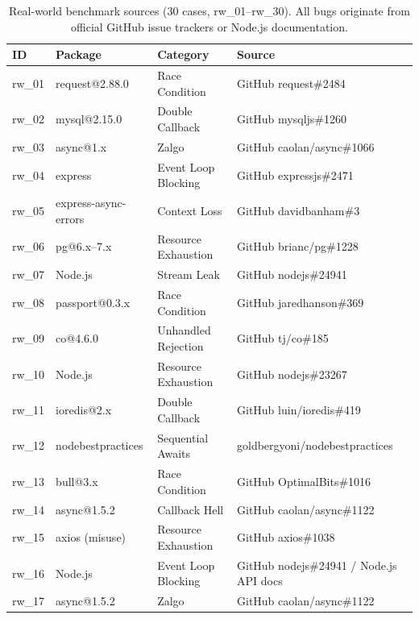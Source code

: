 \documentclass[runningheads]{llncs}
\begin{document}
\begin{table}[H]
  \centering
  \small
  \caption{Real-world benchmark sources (30 cases, rw\_01--rw\_30).
           All bugs originate from official GitHub issue trackers or
           Node.js documentation.}
  \label{tab:benchmark_sources}
  \begin{tabular}{@{}lllp{3.8cm}@{}}
    \toprule
    \textbf{ID} & \textbf{Package} & \textbf{Category} & \textbf{Source} \\
    \midrule
    rw\_01 & request@2.88.0        & Race Condition      & GitHub request\#2484 \\
    rw\_02 & mysql@2.15.0          & Double Callback     & GitHub mysqljs\#1260 \\
    rw\_03 & async@1.x             & Zalgo               & GitHub caolan/async\#1066 \\
    rw\_04 & express                & Event Loop Blocking & GitHub expressjs\#2471 \\
    rw\_05 & express-async-errors  & Context Loss        & GitHub davidbanham\#3 \\
    rw\_06 & pg@6.x--7.x           & Resource Exhaustion & GitHub brianc/pg\#1228 \\
    rw\_07 & Node.js               & Stream Leak         & GitHub nodejs\#24941 \\
    rw\_08 & passport@0.3.x        & Race Condition      & GitHub jaredhanson\#369 \\
    rw\_09 & co@4.6.0              & Unhandled Rejection & GitHub tj/co\#185 \\
    rw\_10 & Node.js               & Resource Exhaustion & GitHub nodejs\#23267 \\
    rw\_11 & ioredis@2.x           & Double Callback     & GitHub luin/ioredis\#419 \\
    rw\_12 & nodebestpractices     & Sequential Awaits   & goldbergyoni/nodebestpractices \\
    rw\_13 & bull@3.x              & Race Condition      & GitHub OptimalBits\#1016 \\
    rw\_14 & async@1.5.2           & Callback Hell       & GitHub caolan/async\#1122 \\
    rw\_15 & axios (misuse)        & Resource Exhaustion & GitHub axios\#1038 \\
    rw\_16 & Node.js               & Event Loop Blocking & GitHub nodejs\#24941 / Node.js API docs \\
    rw\_17 & async@1.5.2           & Zalgo               & GitHub caolan/async\#1122 \\

\end{tabular}
\end{table}
\end{document}
